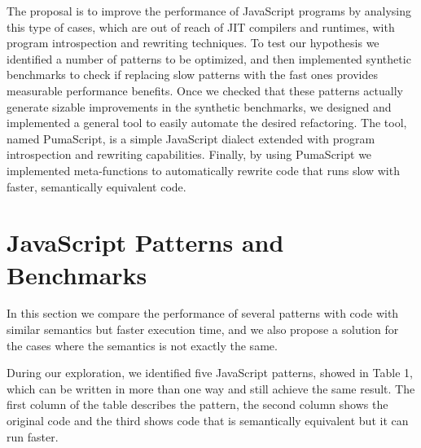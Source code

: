 \documentclass[preprint,10pt]{sigplanconf}
\begin{document}
The proposal is to improve the performance of JavaScript programs by analysing this type of cases, which are out of reach of JIT compilers and runtimes, with program introspection and rewriting techniques. To test our hypothesis we identified a number of patterns to be optimized, and then implemented synthetic benchmarks to check if replacing slow patterns with the fast ones provides measurable performance benefits. Once we checked that these patterns actually generate sizable improvements in the synthetic benchmarks, we designed and implemented a general tool to easily automate the desired refactoring. The tool, named PumaScript, is a simple JavaScript dialect extended with program introspection and rewriting capabilities. Finally, by using PumaScript we implemented meta-functions to automatically rewrite code that runs slow with faster, semantically equivalent code.

\section{JavaScript Patterns and Benchmarks}
\label{sec:benchmarks}
In this section we compare the performance of several patterns with code with similar semantics but faster execution time, and we also propose a solution for the cases where the semantics is not exactly the same.

During our exploration, we identified five JavaScript patterns, showed in Table 1, which can be written in more than one way and still achieve the same result. The first column of the table describes the pattern, the second column shows the original code and the third shows code that is semantically equivalent but it can run faster.

\lstset{style=tablecode}
\end{document}
